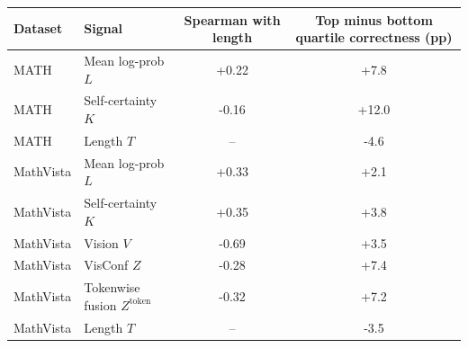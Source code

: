 \begin{tabular}{llcc}\toprule Dataset & Signal & Spearman with length & Top minus bottom quartile correctness (pp) \\ \midrule
MATH & Mean log-prob $L$ & +0.22 & +7.8 \\
MATH & Self-certainty $K$ & -0.16 & +12.0 \\
MATH & Length $T$ & -- & -4.6 \\
MathVista & Mean log-prob $L$ & +0.33 & +2.1 \\
MathVista & Self-certainty $K$ & +0.35 & +3.8 \\
MathVista & Vision $V$ & -0.69 & +3.5 \\
MathVista & VisConf $Z$ & -0.28 & +7.4 \\
MathVista & Tokenwise fusion $Z^{\mathrm{token}}$ & -0.32 & +7.2 \\
MathVista & Length $T$ & -- & -3.5 \\
\bottomrule\end{tabular}

